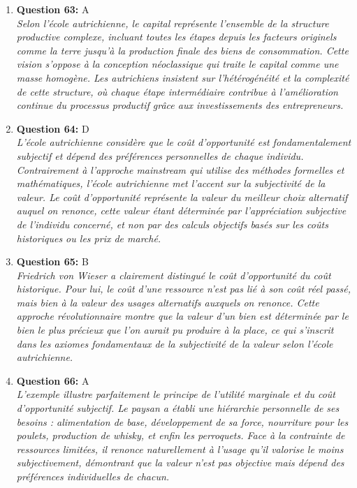\documentclass[12pt,a4paper]{article}
\begin{document}
\begin{enumerate}
\item \textbf{Question 63:} A
\\ \textit{Selon l'école autrichienne, le capital représente l'ensemble de la structure productive complexe, incluant toutes les étapes depuis les facteurs originels comme la terre jusqu'à la production finale des biens de consommation. Cette vision s'oppose à la conception néoclassique qui traite le capital comme une masse homogène. Les autrichiens insistent sur l'hétérogénéité et la complexité de cette structure, où chaque étape intermédiaire contribue à l'amélioration continue du processus productif grâce aux investissements des entrepreneurs.}

\item \textbf{Question 64:} D
\\ \textit{L'école autrichienne considère que le coût d'opportunité est fondamentalement subjectif et dépend des préférences personnelles de chaque individu. Contrairement à l'approche mainstream qui utilise des méthodes formelles et mathématiques, l'école autrichienne met l'accent sur la subjectivité de la valeur. Le coût d'opportunité représente la valeur du meilleur choix alternatif auquel on renonce, cette valeur étant déterminée par l'appréciation subjective de l'individu concerné, et non par des calculs objectifs basés sur les coûts historiques ou les prix de marché.}

\item \textbf{Question 65:} B
\\ \textit{Friedrich von Wieser a clairement distingué le coût d'opportunité du coût historique. Pour lui, le coût d'une ressource n'est pas lié à son coût réel passé, mais bien à la valeur des usages alternatifs auxquels on renonce. Cette approche révolutionnaire montre que la valeur d'un bien est déterminée par le bien le plus précieux que l'on aurait pu produire à la place, ce qui s'inscrit dans les axiomes fondamentaux de la subjectivité de la valeur selon l'école autrichienne.}

\item \textbf{Question 66:} A
\\ \textit{L'exemple illustre parfaitement le principe de l'utilité marginale et du coût d'opportunité subjectif. Le paysan a établi une hiérarchie personnelle de ses besoins : alimentation de base, développement de sa force, nourriture pour les poulets, production de whisky, et enfin les perroquets. Face à la contrainte de ressources limitées, il renonce naturellement à l'usage qu'il valorise le moins subjectivement, démontrant que la valeur n'est pas objective mais dépend des préférences individuelles de chacun.}


\end{enumerate}
\end{document}
